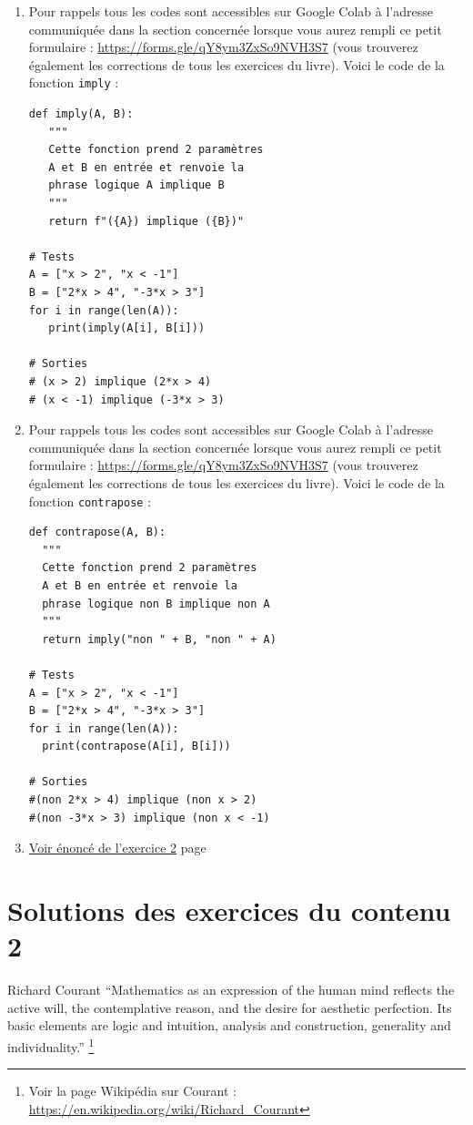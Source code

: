 \documentclass[a4paper,11pt]{book}
\begin{document}
\begin{enumerate}
\item Pour rappels tous les codes sont accessibles sur Google Colab à
l'adresse communiquée dans la section concernée lorsque vous aurez
rempli ce petit formulaire : \url{https://forms.gle/qY8ym3ZxSo9NVH3S7}
(vous trouverez également les corrections de tous les exercices du
livre).
Voici le code de la fonction \texttt{imply} :
\begin{verbatim}
def imply(A, B):
   """
   Cette fonction prend 2 paramètres
   A et B en entrée et renvoie la
   phrase logique A implique B
   """
   return f"({A}) implique ({B})"

# Tests
A = ["x > 2", "x < -1"]
B = ["2*x > 4", "-3*x > 3"]
for i in range(len(A)):
   print(imply(A[i], B[i]))

# Sorties
# (x > 2) implique (2*x > 4)
# (x < -1) implique (-3*x > 3)
\end{verbatim}
\item Pour rappels tous les codes sont accessibles sur Google Colab à
l'adresse communiquée dans la section concernée lorsque vous aurez
rempli ce petit formulaire :
\url{https://forms.gle/qY8ym3ZxSo9NVH3S7} (vous trouverez également les
corrections de tous les exercices du livre).
Voici le code de la fonction \texttt{contrapose} : 
\begin{verbatim}
def contrapose(A, B):
  """
  Cette fonction prend 2 paramètres
  A et B en entrée et renvoie la
  phrase logique non B implique non A
  """
  return imply("non " + B, "non " + A)

# Tests
A = ["x > 2", "x < -1"]
B = ["2*x > 4", "-3*x > 3"] 
for i in range(len(A)):
  print(contrapose(A[i], B[i]))

# Sorties
#(non 2*x > 4) implique (non x > 2)
#(non -3*x > 3) implique (non x < -1)
\end{verbatim}

\item \hyperref[orgce66a51]{Voir énoncé de l'exercice 2}
page~\pageref{page:sec2.1.8exo2}
\end{enumerate}

\clearpage

\chapter{Solutions des exercices du contenu 2}
\label{sec:orge2a9ff2}
\label{org56f3479}
\label{page:sec8.2sols-cont2}

\begin{myquote}{Richard Courant}
\enquote{Mathematics as an expression of the human mind reflects the active
will, the contemplative reason, and the desire for aesthetic
perfection. Its basic elements are logic and intuition, analysis
and construction, generality and individuality.}
\footnote{Voir la page Wikipédia sur Courant : \url{https://en.wikipedia.org/wiki/Richard_Courant}}
\end{myquote}
\end{document}
